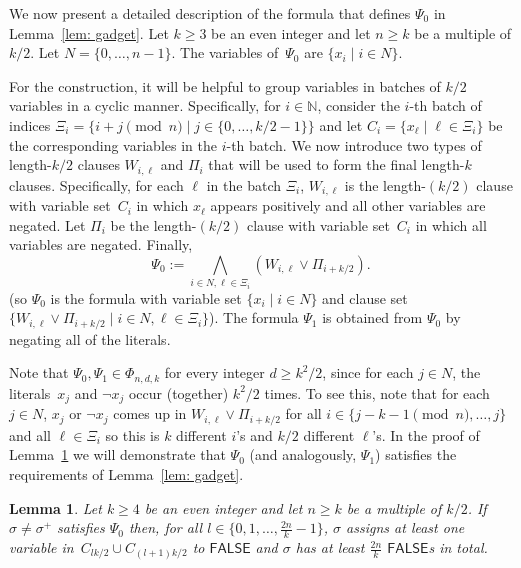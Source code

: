 \documentclass[11pt]{article}
\newtheorem{lemma}[theorem]{Lemma}
\theoremstyle{definition}
\theoremstyle{remark}
\def\FALSE{\mathsf{FALSE}}
\begin{document}
  
 
 

We now present a detailed description of the formula that defines $\Psi_0$ in Lemma~\ref{lem: gadget}. 
Let $k\geq 3$ be an even integer and let $n\geq k$ be a multiple of $k/2$.  
Let $N = \{0,\ldots,n-1\}$.
The variables of~$\Psi_0$ are $\{ x_i \mid i\in N\}$. 
 

For the construction, it will be helpful to group variables in batches of $k/2$ variables in a cyclic manner. Specifically, for $i\in  \mathbb{N}$, consider the $i$-th batch of indices
$\Xi_i = \{ i+j \pmod n \mid j \in \{0,\ldots, k/2-1\} \}$ 
and let $C_i = \{x_\ell \mid \ell \in \Xi_i\}$ be the corresponding variables in the $i$-th batch. We now introduce two types of length-$k/2$ clauses $W_{i,\ell}$ and $\Pi_i$ that will be used to form the final length-$k$ clauses. 
Specifically, for each $\ell$ in the batch $\Xi_i$, $W_{i,\ell}$ is the length-$(k/2)$ clause with variable set~$C_i$ in which $x_\ell$ appears positively and all other variables are negated. 
Let $\Pi_i$ be the length-$(k/2)$ clause with variable set~$C_i$ in which all variables are negated. 
Finally, 
\[\Psi_0 := \bigwedge_{i\in N, \ell \in \Xi_i} (W_{i,\ell} \vee \Pi_{i+k/2}).\]
(so
 $\Psi_0$
is the formula with variable set $  \{ x_i \mid i \in N\}$ 
and clause set 
$  \{ W_{i,\ell} \vee \Pi_{i+k/2} \mid  {i \in  N}, {\ell \in \Xi_{i}}  \}  
 $).
The formula $\Psi_1$ is obtained from $\Psi_0$ by negating all of the literals.
 

Note that $\Psi_0, \Psi_1 \in \Phi_{n,d,k}$ for every integer $d\geq k^2/2$,  
since for each $j\in N$, the literals~$x_j$ and $\neg x_j$ occur (together) $k^2/2$  times. To see this, 
note that for each $j\in N$, $x_j$ or $\neg x_j$ comes up in $W_{i,\ell} \vee \Pi_{i+k/2}$ for 
all $i\in \{j-k-1 \pmod n,\ldots,j\}$ and all $\ell \in  \Xi_i$ so this is $k$ different $i$'s and $k/2$ different $\ell$'s.  
In the proof of Lemma~\ref{lem:CoverGadget} we will demonstrate that  $\Psi_0$ (and analogously, $\Psi_1$) satisfies the requirements of Lemma~\ref{lem: gadget}.



 
\begin{lemma}\label{lem:CoverGadget}
Let $k\ge 4$ be an even integer and let $n\geq k$ be a multiple of $k/2$. 
If $\sigma \neq \sigma^+$ satisfies $\Psi_0$
then,  for all 
$l\in \{0,1,\ldots,\frac{2n}{k}-1\}$, 
$\sigma$ assigns at least one variable in~$C_{lk/2} \cup C_{(l+1)k/2}$ to $\FALSE$ and $\sigma$ has at least $\frac{2n}{k}$ $\FALSE$s in total.
\end{lemma}
\end{document}
